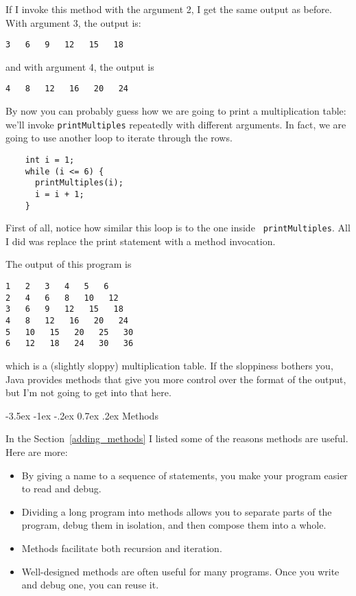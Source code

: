 \documentclass{book}
\makeatletter
\renewcommand{\section}{\@startsection 
    {section} {1} {0mm}%
    {-3.5ex \@plus -1ex \@minus -.2ex}%
    {0.7ex \@plus.2ex}%
    {\normalfont\Large\bfseries}}
\makeatother
\begin{document}
If I invoke this method with the argument 2, I get the same
output as before.  With argument 3, the output is:

\begin{verbatim}
3   6   9   12   15   18
\end{verbatim}
%
and with argument 4, the output is

\begin{verbatim}
4   8   12   16   20   24 
\end{verbatim}
%
By now you can probably guess how we are going to print a
multiplication table: we'll invoke {\tt printMultiples} repeatedly with
different arguments.  In fact, we are going to use another loop to
iterate through the rows.

\begin{verbatim}
    int i = 1;
    while (i <= 6) {
      printMultiples(i);
      i = i + 1;
    }    
\end{verbatim}
%
First of all, notice how similar this loop is to the one inside {\tt
printMultiples}.  All I did was replace the print statement with a
method invocation.

The output of this program is

\begin{verbatim}
1   2   3   4   5   6   
2   4   6   8   10   12   
3   6   9   12   15   18   
4   8   12   16   20   24   
5   10   15   20   25   30   
6   12   18   24   30   36   
\end{verbatim}
%
which is a (slightly sloppy) multiplication table.  If the
sloppiness bothers you, Java provides methods that give you
more control over the format of the output, but I'm not
going to get into that here.


\section{Methods}
\label{methods}

In the Section~\ref{adding_methods} I listed some of the
reasons methods are useful.  Here are more:

\begin{itemize}

\item By giving a name to a sequence of statements, you make
your program easier to read and debug.

\item Dividing a long program into methods allows you to
separate parts of the program, debug them in isolation, and
then compose them into a whole.

\item Methods facilitate both recursion and iteration.

\item Well-designed methods are often useful for many programs.
Once you write and debug one, you can reuse it.

\end{itemize}
\end{document}
